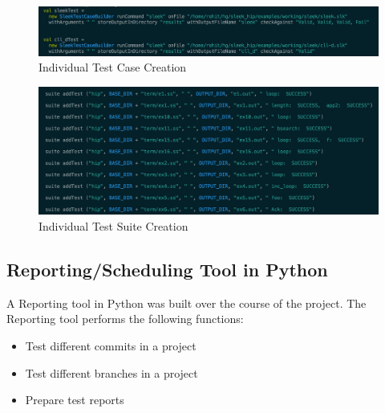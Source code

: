\documentclass[12pt]{article}
\begin{document}
\begin{figure}[h!]
  \centering
    \includegraphics[width=500px]{figures/DSL_create_test.png}
  \caption{Individual Test Case Creation}
\end{figure}

\begin{figure}[h!]
  \centering
    \includegraphics[width=500px]{figures/DSL_test_suite.png}
  \caption{Individual Test Suite Creation}
\end{figure}

\newpage
\subsection{Reporting/Scheduling Tool in Python}
A Reporting tool in Python was built over the course of the project. The Reporting tool performs the following functions:
\begin{itemize}
\item Test different commits in a project
\item Test different branches in a project
\item Prepare test reports
\end{itemize}
\end{document}
